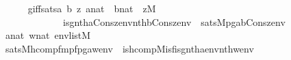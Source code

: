 \begin{isabellebody}
\ \ \ \ \isanewline
\ \ \ \ g{\isacharunderscore}{\kern0pt}iff{\isacharunderscore}{\kern0pt}sats{\isacharcolon}{\kern0pt}{\isachardoublequoteopen}{\isasymAnd}a\ b\ z{\isachardot}{\kern0pt}\ a{\isasymin}nat\ {\isasymLongrightarrow}\ b{\isasymin}nat\ {\isasymLongrightarrow}\ z{\isasymin}M\ {\isasymLongrightarrow}\ \isanewline
\ \ \ \ \ \ \ \ \ \ \ \ \ \ \ \ is{\isacharunderscore}{\kern0pt}g{\isacharparenleft}{\kern0pt}nth{\isacharparenleft}{\kern0pt}a{\isacharcomma}{\kern0pt}Cons{\isacharparenleft}{\kern0pt}z{\isacharcomma}{\kern0pt}env{\isacharparenright}{\kern0pt}{\isacharparenright}{\kern0pt}{\isacharcomma}{\kern0pt}nth{\isacharparenleft}{\kern0pt}b{\isacharcomma}{\kern0pt}Cons{\isacharparenleft}{\kern0pt}z{\isacharcomma}{\kern0pt}env{\isacharparenright}{\kern0pt}{\isacharparenright}{\kern0pt}{\isacharparenright}{\kern0pt}\ {\isasymlongleftrightarrow}\ sats{\isacharparenleft}{\kern0pt}M{\isacharcomma}{\kern0pt}pg{\isacharparenleft}{\kern0pt}a{\isacharcomma}{\kern0pt}b{\isacharparenright}{\kern0pt}{\isacharcomma}{\kern0pt}Cons{\isacharparenleft}{\kern0pt}z{\isacharcomma}{\kern0pt}env{\isacharparenright}{\kern0pt}{\isacharparenright}{\kern0pt}{\isachardoublequoteclose}\isanewline
\ \ \ \ \isanewline
\ \ \ \ {\isachardoublequoteopen}a{\isasymin}nat{\isachardoublequoteclose}\ {\isachardoublequoteopen}w{\isasymin}nat{\isachardoublequoteclose}\ {\isachardoublequoteopen}env{\isasymin}list{\isacharparenleft}{\kern0pt}M{\isacharparenright}{\kern0pt}{\isachardoublequoteclose}\ \isanewline
\ \ \isanewline
\ \ \ \ {\isachardoublequoteopen}sats{\isacharparenleft}{\kern0pt}M{\isacharcomma}{\kern0pt}hcomp{\isacharunderscore}{\kern0pt}fm{\isacharparenleft}{\kern0pt}pf{\isacharcomma}{\kern0pt}pg{\isacharcomma}{\kern0pt}a{\isacharcomma}{\kern0pt}w{\isacharparenright}{\kern0pt}{\isacharcomma}{\kern0pt}env{\isacharparenright}{\kern0pt}\ {\isasymlongleftrightarrow}\ is{\isacharunderscore}{\kern0pt}hcomp{\isacharparenleft}{\kern0pt}{\isacharhash}{\kern0pt}{\isacharhash}{\kern0pt}M{\isacharcomma}{\kern0pt}is{\isacharunderscore}{\kern0pt}f{\isacharcomma}{\kern0pt}is{\isacharunderscore}{\kern0pt}g{\isacharcomma}{\kern0pt}nth{\isacharparenleft}{\kern0pt}a{\isacharcomma}{\kern0pt}env{\isacharparenright}{\kern0pt}{\isacharcomma}{\kern0pt}nth{\isacharparenleft}{\kern0pt}w{\isacharcomma}{\kern0pt}env{\isacharparenright}{\kern0pt}{\isacharparenright}{\kern0pt}{\isachardoublequoteclose}\ \isanewline
%
\isadelimproof
%
\endisadelimproof
%
\isatagproof
{}\isamarkupfalse%
\ {\isacharminus}{\kern0pt}\isanewline
\ \ \isamarkupfalse%

\end{isabellebody}
